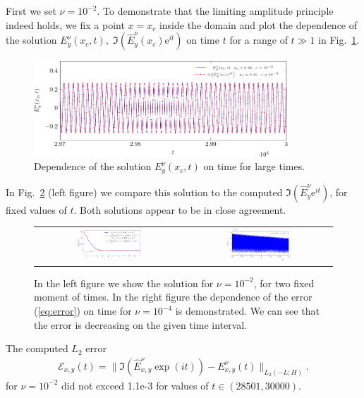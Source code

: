 First we set $\nu=10^{-2}$. To demonstrate that the limiting amplitude principle indeed holds, we fix a point $x=x_c$ 
inside the domain and plot the dependence of the solution $E_{y}^{\nu}(x_c,t), \; \Im\left(\hat{E}_y^{\nu}(x_c)\mathrm{e}^{it}\right)$ 
on time $t$ for a range of $t\gg 1$ in Fig.~\ref{fig:nu1e2_harmon}.  

\begin{figure}[htb]
\includegraphics[width=0.85\textwidth]{airy/figure_nu1e2-crop.pdf}
\caption{Dependence of the solution $E_{y}^{\nu}(x_c,t)$ on time for large times.}
 \label{fig:nu1e2_harmon}
\end{figure}

In Fig.~\ref{fig:nu1e2_harmon2} (left figure) we compare this solution to the computed $\Im\left(\hat{E}_y^{\nu}\mathrm{e}^{it}\right)$, for
fixed values of $t$. Both solutions appear to be in close agreement. 
\begin{figure}[htb]
 \begin{tabular}{cc}
\includegraphics[width=0.45\textwidth]{airy/figure_nu1e2_2-crop.pdf}
&
\includegraphics[width=0.45\textwidth]{airy/figure_error_nu1e4-crop.pdf}\\
\end{tabular}
\caption{In the left figure we show the solution for $\nu=10^{-2}$, for two fixed moment of times. In the right figure 
the dependence of the error (\ref{eq:error}) on time for $\nu=10^{-4}$ is demonstrated. 
We can see that the error is decreasing on the given time interval.}
 \label{fig:nu1e2_harmon2}
\end{figure}
\FloatBarrier
The computed $L_2$ error
\begin{align}
\label{eq:error}
\mathcal{E}_{x,y}(t)=\|\Im\left(\hat{E}_{x,y}^{\nu}\exp(it)\right)-E_{x,y}^{\nu}(t)\|_{L_{2}(-L;H)}.
\end{align}
for $\nu=10^{-2}$ did not exceed 1.1e-3 for values of $t\in \left(28501,  30000\right)$. 

